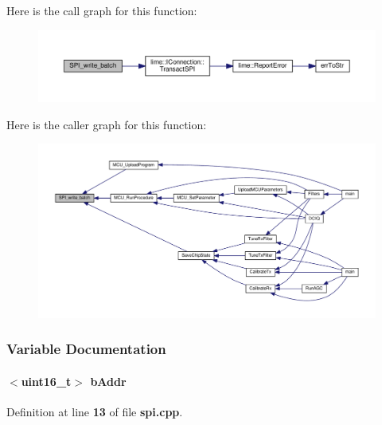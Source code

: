 Here is the call graph for this function\+:
\nopagebreak
\begin{figure}[H]
\begin{center}
\leavevmode
\includegraphics[width=350pt]{dd/d7e/spi_8cpp_a436d1cddc5e8437f75c92f6b65db2798_cgraph}
\end{center}
\end{figure}




Here is the caller graph for this function\+:
\nopagebreak
\begin{figure}[H]
\begin{center}
\leavevmode
\includegraphics[width=350pt]{dd/d7e/spi_8cpp_a436d1cddc5e8437f75c92f6b65db2798_icgraph}
\end{center}
\end{figure}




\subsubsection{Variable Documentation}
\paragraph[{b\+Addr}]{$<$uint16\+\_\+t$>$ b\+Addr}\label{spi_8cpp_a9f2ef19d5309f85e8c487704cd310dee}


Definition at line {\bf 13} of file {\bf spi.\+cpp}.

